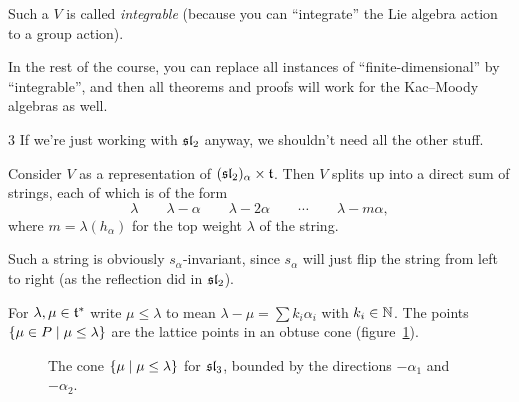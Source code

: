 \begin{definition}
Such a $V$ is called \emph{integrable} (because you can ``integrate'' the Lie
algebra action to a group action).
\end{definition}

In the rest of the course, you can replace all instances of
``finite-dimensional'' by ``integrable'', and then all theorems and proofs will
work for the Kac--Moody algebras as well.

\begin{sketch}{3}
If we're just working with $\sl_2$ anyway, we shouldn't need all the other
stuff.

\begin{exercise}
Consider $V$ as a representation of $(\sl_2)_\alpha \times \at$. Then $V$
splits up into a direct sum of strings, each of which is of the form
\[
  \lambda \qquad \lambda - \alpha \qquad \lambda - 2\alpha \qquad \cdots \qquad \lambda - m\alpha,
\]
where $m = \lambda(h_\alpha)$ for the top weight $\lambda$ of the string.
\end{exercise}

Such a string is obviously $s_\alpha$-invariant, since $s_\alpha$ will just
flip the string from left to right (as the reflection did in $\sl_2$).
\end{sketch}


\begin{definition}
For $\lambda, \mu \in \at^*$ write $\mu \leq \lambda$ to mean
$\lambda - \mu = \sum k_i\alpha_i$ with $k_i \in \N$. The points
$\setc{\mu \in P}{\mu \leq \lambda}$ are the lattice points in an obtuse cone
(figure~\ref{fig:cone}).
\end{definition}

\begin{figure}[!htbp]
\centering
{}
\caption{The cone $\setc{\mu}{\mu \leq \lambda}$ for $\sl_3$, bounded by the
directions $-\alpha_1$ and $-\alpha_2$.}
\label{fig:cone}
\end{figure}

